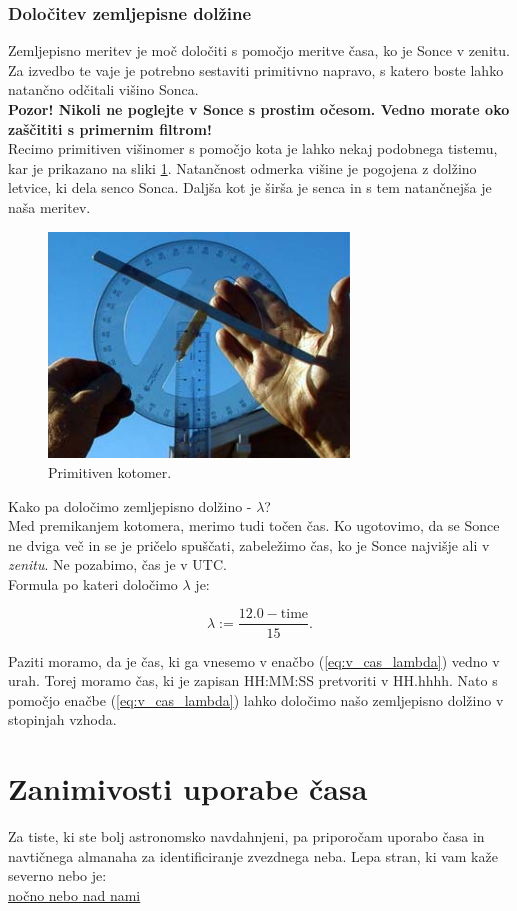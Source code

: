 \subsubsection{Določitev zemljepisne dolžine}
Zemljepisno meritev je moč določiti s pomočjo meritve časa, ko je Sonce v zenitu. Za izvedbo te vaje je potrebno sestaviti primitivno napravo, s katero boste lahko natančno odčitali višino Sonca.\\[2mm]
%
\textbf{Pozor! Nikoli ne poglejte v Sonce s prostim očesom. Vedno morate oko zaščititi s primernim filtrom!}\\[2mm]
%
Recimo primitiven višinomer s pomočjo kota je lahko nekaj podobnega tistemu, kar je prikazano na sliki \ref{fig:v_cas_kotomer}. Natančnost odmerka višine je pogojena z dolžino letvice, ki dela senco Sonca. Daljša kot je širša je senca in s tem natančnejša je naša meritev. 
%
\begin{figure}[!htbp]
	\centering \includegraphics[width=8cm]{Vaje/CasPomorstvo/figs/kotomer.jpg}
	\caption{Primitiven kotomer.}
	\label{fig:v_cas_kotomer}
\end{figure}
%
Kako pa določimo zemljepisno dolžino - $\lambda$?\\[2mm]
%
Med premikanjem kotomera, merimo tudi točen čas. Ko ugotovimo, da se Sonce ne dviga več in se je pričelo spuščati, zabeležimo čas, ko je Sonce najvišje ali v \emph{zenitu}. Ne pozabimo, čas je v UTC.\\[2mm]
%
Formula po kateri določimo $\lambda$ je:

\begin{equation}
\label{eq:v_cas_lambda} 
\lambda := \frac{12.0 - \text{time} }{15}.
\end{equation}

Paziti moramo, da je čas, ki ga vnesemo v enačbo (\ref{eq:v_cas_lambda}) vedno v urah. Torej moramo čas, ki je zapisan HH:MM:SS pretvoriti v HH.hhhh. Nato s pomočjo enačbe (\ref{eq:v_cas_lambda}) lahko določimo našo zemljepisno dolžino v stopinjah vzhoda.

\section{Zanimivosti uporabe časa}
Za tiste, ki ste bolj astronomsko navdahnjeni, pa priporočam uporabo časa in navtičnega almanaha za identificiranje zvezdnega neba. Lepa stran, ki vam kaže severno nebo je:\\[2mm]
%
\href{http://www.jodcast.net/sky}{nočno nebo nad nami}
%
